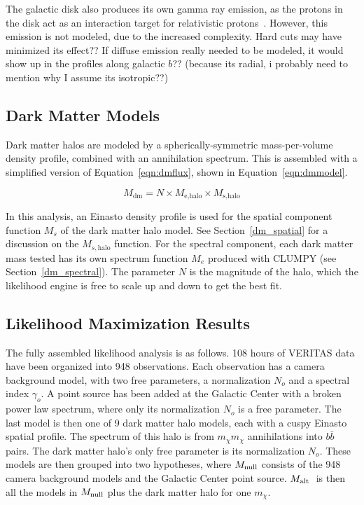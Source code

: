   The galactic disk also produces its own gamma ray emission, as the protons in the disk act as an interaction target for relativistic protons~\cite{tevgev_gc_diffuse}.
  However, this emission is not modeled, due to the increased complexity.
  {\color{red}
  Hard cuts may have minimized its effect??
  If diffuse emission really needed to be modeled, it would show up in the profiles along galactic $b$??
  (because its radial, i probably need to mention why I assume its isotropic??)
  }
  
  \subsection{Dark Matter Models}\label{subsec:dmhalomodel}
  Dark matter halos are modeled by a spherically-symmetric mass-per-volume density profile, combined with an annihilation spectrum.
  This is assembled with a simplified version of Equation~\ref{eqn:dmflux}, shown in Equation~\ref{eqn:dmmodel}.
  
  \begin{equation}\label{eqn:dmmodel}
    M_{\textrm{dm}} = N \times M_{\textrm{e,halo}} \times M_{\textrm{s,halo}}
  \end{equation}
  
  In this analysis, an Einasto density profile is used for the spatial component function $M_s$ of the dark matter halo model.
  See Section~\ref{dm_spatial} for a discussion on the $M_{s,\textrm{halo}}$ function.
  For the spectral component, each dark matter mass tested has its own spectrum function $M_e$ produced with CLUMPY (see Section~\ref{dm_spectral}).
  The parameter $N$ is the magnitude of the halo, which the likelihood engine is free to scale up and down to get the best fit.

  \subsection{Likelihood Maximization Results}\label{like_results}

  The fully assembled likelihood analysis is as follows.
  108 hours of VERITAS data have been organized into 948 observations.
  Each observation has a camera background model, with two free parameters, a normalization $N_o$ and a spectral index $\gamma_o$.
  A point source has been added at the Galactic Center with a broken power law spectrum, where only its normalization $N_o$ is a free parameter.
  The last model is then one of 9 dark matter halo models, each with a cuspy Einasto spatial profile.
  The spectrum of this halo is from $m_{\chi}m_{\chi}$ annihilations into $b\bar{b}$ pairs.
  The dark matter halo's only free parameter is its normalization $N_o$.
  These models are then grouped into two hypotheses, where $M_\textrm{null}$ consists of the 948 camera background models and the Galactic Center point source.
  $M_\textrm{alt }$ is then all the models in $M_\textrm{null}$ plus the dark matter halo for one $m_{\chi}$.
  
